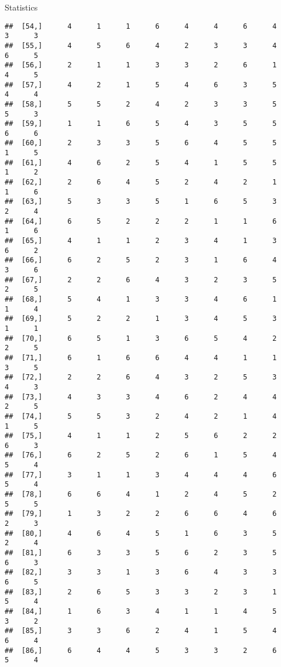 \documentclass[
  ignorenonframetext,
]{beamer}
\begin{document}
\begin{frame}[fragile]{Statistics}
\begin{verbatim}
##  [54,]      4      1      1      6      4      4      6      4      3      3
##  [55,]      4      5      6      4      2      3      3      4      6      5
##  [56,]      2      1      1      3      3      2      6      1      4      5
##  [57,]      4      2      1      5      4      6      3      5      4      4
##  [58,]      5      5      2      4      2      3      3      5      5      3
##  [59,]      1      1      6      5      4      3      5      5      6      6
##  [60,]      2      3      3      5      6      4      5      5      1      5
##  [61,]      4      6      2      5      4      1      5      5      1      2
##  [62,]      2      6      4      5      2      4      2      1      1      6
##  [63,]      5      3      3      5      1      6      5      3      2      4
##  [64,]      6      5      2      2      2      1      1      6      1      6
##  [65,]      4      1      1      2      3      4      1      3      6      2
##  [66,]      6      2      5      2      3      1      6      4      3      6
##  [67,]      2      2      6      4      3      2      3      5      2      5
##  [68,]      5      4      1      3      3      4      6      1      1      4
##  [69,]      5      2      2      1      3      4      5      3      1      1
##  [70,]      6      5      1      3      6      5      4      2      2      5
##  [71,]      6      1      6      6      4      4      1      1      3      5
##  [72,]      2      2      6      4      3      2      5      3      4      3
##  [73,]      4      3      3      4      6      2      4      4      2      5
##  [74,]      5      5      3      2      4      2      1      4      1      5
##  [75,]      4      1      1      2      5      6      2      2      6      3
##  [76,]      6      2      5      2      6      1      5      4      5      4
##  [77,]      3      1      1      3      4      4      4      6      5      4
##  [78,]      6      6      4      1      2      4      5      2      5      5
##  [79,]      1      3      2      2      6      6      4      6      2      3
##  [80,]      4      6      4      5      1      6      3      5      2      4
##  [81,]      6      3      3      5      6      2      3      5      6      3
##  [82,]      3      3      1      3      6      4      3      3      6      5
##  [83,]      2      6      5      3      3      2      3      1      5      4
##  [84,]      1      6      3      4      1      1      4      5      3      2
##  [85,]      3      3      6      2      4      1      5      4      6      4
##  [86,]      6      4      4      5      3      3      2      6      5      4

\end{verbatim}
\end{frame}
\end{document}
